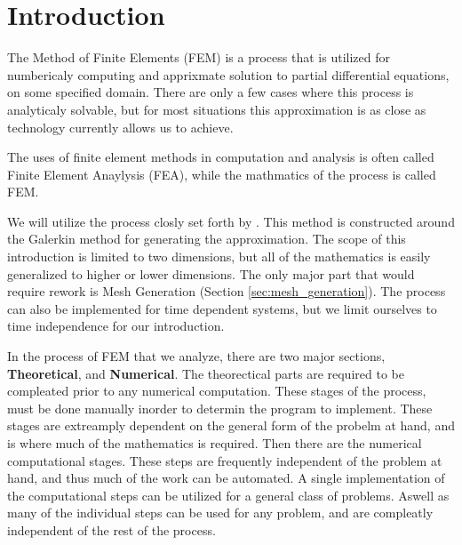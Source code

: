 \documentclass[../fem.tex]{subfiles}
\begin{document}
\section{Introduction}%
\label{sec:introduction}

The Method of Finite Elements (FEM) is a process that is utilized for
numbericaly computing and apprixmate solution to partial differential
equations, on some specified domain. There are only a few cases where this
process is analyticaly solvable, but for most situations this approximation is
as close as technology currently allows us to achieve.

The uses of finite element methods in computation and analysis is often called
Finite Element Anaylysis (FEA), while the mathmatics of the process is called
FEM.

We will utilize the process closly set forth by \cite{KH}. This method is
constructed around the Galerkin method for generating the approximation. The
scope of this introduction is limited to two dimensions, but all of the
mathematics is easily generalized to higher or lower dimensions. The only major
part that would require rework is Mesh Generation (Section
\ref{sec:mesh_generation}). The process can also be implemented for time
dependent systems, but we limit ourselves to time independence for our
introduction.

In the process of FEM that we analyze, there are two major sections,
\textbf{Theoretical}, and \textbf{Numerical}. The theorectical parts are
required to be compleated prior to any numerical computation. These stages of
the process, must be done manually inorder to determin the program to
implement. These stages are extreamply dependent on the general form of the
probelm at hand, and is where much of the mathematics is required. Then
there are the numerical computational stages. These steps are frequently
independent of the problem at hand, and thus much of the work can be automated.
A single implementation of the computational steps can be utilized for a
general class of problems. Aswell as many of the individual steps can be used
for any problem, and are compleatly independent of the rest of the process.
\end{document}
